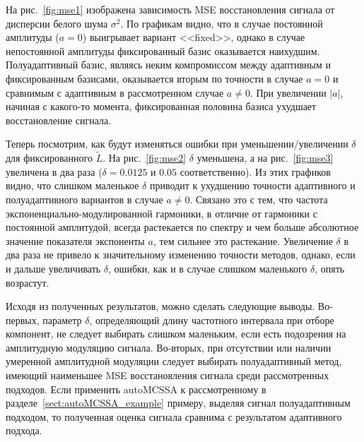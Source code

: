 \documentclass[specialist,
substylefile = spbu_report.rtx,
subf,href,colorlinks=true, 12pt]{disser}
\theoremstyle{definition}
\begin{document}
На рис.~\ref{fig:mse1} изображена зависимость MSE восстановления сигнала от дисперсии белого шума $\sigma^2$. По графикам видно, что в случае постоянной амплитуды ($a=0$) выигрывает вариант <<fixed>>, однако в случае непостоянной амплитуды фиксированный базис оказывается наихудшим. Полуадаптивный базис, являясь неким компромиссом между адаптивным и фиксированным базисами, оказывается вторым по точности в случае $a=0$ и сравнимым с адаптивным в рассмотренном случае $a\ne0$. При увеличении $|a|$, начиная с какого-то момента, фиксированная половина базиса ухудшает восстановление сигнала.

Теперь посмотрим, как будут изменяться ошибки при уменьшении/увеличении $\delta$ для фиксированного $\widetilde L$. На рис.~\ref{fig:mse2} $\delta$ уменьшена, а на рис.~\ref{fig:mse3} увеличена в два раза ($\delta=0.0125$ и $0.05$ соответственно). Из этих графиков видно, что слишком маленькое $\delta$ приводит к ухудшению точности адаптивного и полуадаптивного вариантов в случае $a\ne0$. Связано это с тем, что частота экспоненциально-модулированной гармоники, в отличие от гармоники с постоянной амплитудой, всегда растекается по спектру и чем больше абсолютное значение показателя экспоненты $a$, тем сильнее это растекание. Увеличение $\delta$ в два раза не привело к значительному изменению точности методов, однако, если и дальше увеличивать $\delta$, ошибки, как и в случае слишком маленького $\delta$, опять возрастут.

Исходя из полученных результатов, можно сделать следующие выводы. Во-первых, параметр $\delta$, определяющий длину частотного интервала при отборе компонент, не следует выбирать слишком маленьким, если есть подозрения на амплитудную модуляцию сигнала. Во-вторых, при отсутствии или наличии умеренной амплитудной модуляции следует выбирать полуадаптивный метод, имеющий наименьшее MSE восстановления сигнала среди рассмотренных подходов. Если применить autoMCSSA к рассмотренному в разделе~\ref{sect:autoMCSSA_example} примеру, выделяя сигнал полуадаптивным подходом, то полученная оценка сигнала сравнима с результатом адаптивного подхода.
\end{document}
